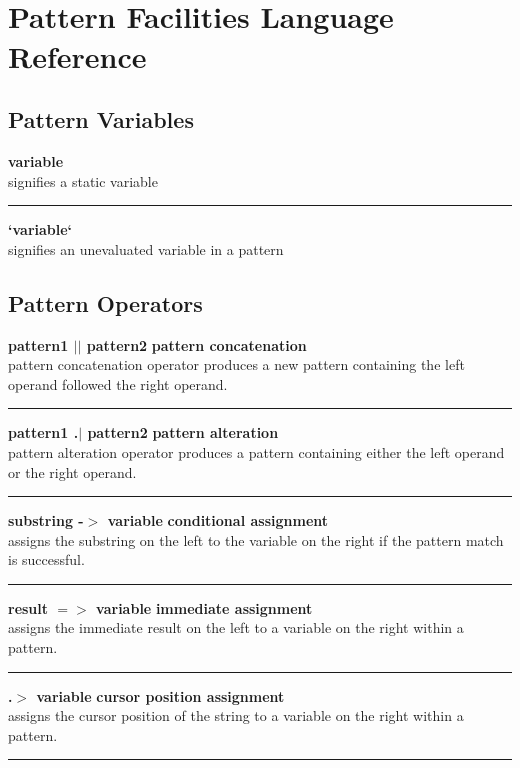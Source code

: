 \documentclass{article}
\begin{document}
\newpage
\appendix
\section{\\Pattern Facilities Language Reference} \label{App:AppendixA}
\subsection{Pattern Variables}
\textbf{variable} \\
signifies a static variable\\
\noindent\rule{12cm}{0.4pt}
 
\noindent\textbf{`variable`} \\
signifies an unevaluated variable in a pattern\\

\subsection{Pattern Operators}
\noindent\textbf{pattern1 $\vert\vert$	pattern2} \hfill \textbf{pattern concatenation}\\
pattern concatenation operator produces a new pattern containing the left operand followed the right operand.\\
\noindent\rule{12cm}{0.4pt}

\noindent\textbf{pattern1 .$\vert$ pattern2} \hfill \textbf{pattern alteration}\\
pattern alteration operator produces a pattern containing either the left operand or the right operand.\\
\noindent\rule{12cm}{0.1pt}

\noindent\textbf{substring -$>$ variable} \hfill\textbf{conditional assignment}\\
assigns the substring on the left to the variable on the right if the pattern match is successful.\\
\noindent\rule{12cm}{0.1pt}

\noindent\textbf{result $=>$ variable} \hfill\textbf{immediate assignment}\\
assigns the immediate result on the left to a variable on the right within a pattern.\\
\noindent\rule{12cm}{0.1pt}

\noindent\textbf{.$>$ variable} \hfill\textbf{cursor position assignment}\\
assigns the cursor position of the string to a variable on the right within a pattern.\\
\noindent\rule{12cm}{0.1pt}
\end{document}
